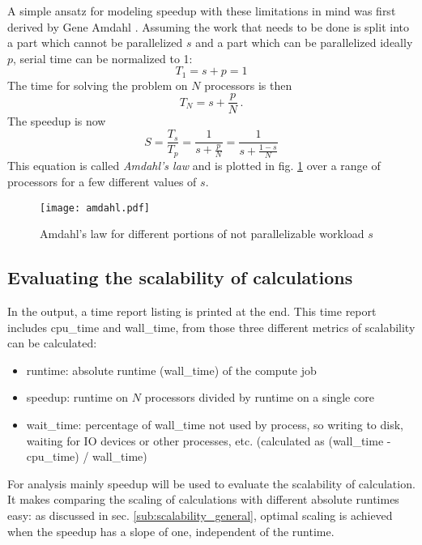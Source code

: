 \documentclass[main.tex]{subfiles}
\begin{document}
A simple ansatz for modeling speedup with these limitations in mind was first derived by Gene Amdahl \cite{amdahl_validity_1967}.
Assuming the work that needs to be done is split into a part which cannot be parallelized \(s\) and a part which can be parallelized ideally \(p\), serial time can be normalized to 1:
\begin{equation}
    T_1 = s + p = 1
\end{equation}
The time for solving the problem on \(N\) processors is then
\begin{equation}
    T_N = s + \frac{p}{N}\,.
\end{equation}
The speedup is now
\begin{equation}\label{eq:amdahls_law}
    S = \frac{T_s}{T_p} = \frac{1}{s + \frac{p}{N}} = \frac{1}{s + \frac{1 - s}{N}}
\end{equation}
This equation is called \emph{Amdahl's law} and is plotted in fig. \ref{fig:amdahl} over a range of processors for a few different values of \(s\).

\begin{figure}[ht!]
    \centering
    \texttt{[image: amdahl.pdf]}
    \label{fig:amdahl}
    \caption{Amdahl's law for different portions of not parallelizable workload \(s\)}
\end{figure}

\subsection{Evaluating the scalability of \QE calculations}\label{sub:scalability_qe}



In the \QE output, a time report listing is printed at the end.
This time report includes \gls{cpu_time} and \gls{wall_time}, from those three different metrics of scalability can be calculated:
\begin{itemize}
    \item runtime: absolute runtime (\gls{wall_time}) of the compute job
    \item speedup: runtime on \(N\) processors divided by runtime on a single core
    \item \gls{wait_time}: percentage of \gls{wall_time} not used by \QE process, so writing to disk, waiting for IO devices or other processes, etc. (calculated as (\gls{wall_time} - \gls{cpu_time}) / \gls{wall_time})
\end{itemize}
For analysis mainly speedup will be used to evaluate the scalability of \QE calculation.
It makes comparing the scaling of calculations with different absolute runtimes easy: as discussed in sec. \ref{sub:scalability_general}, optimal scaling is achieved when the speedup has a slope of one, independent of the runtime.
\end{document}
